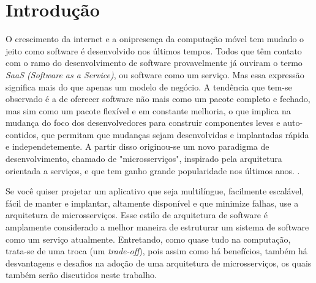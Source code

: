 \chapter{Introdução}\label{chapter-introducao}

O crescimento da internet e a onipresença da computação móvel tem mudado o jeito como software é desenvolvido nos últimos tempos. Todos que têm contato com o ramo do desenvolvimento de software provavelmente já ouviram o termo \emph{SaaS (Software as a Service)}, ou software como um serviço. Mas essa expressão significa mais do que apenas um modelo de negócio. A tendência que tem-se observado é a de oferecer software não mais como um pacote completo e fechado, mas sim como um pacote flexível e em constante melhoria, o que implica na mudança do foco dos desenvolvedores para construir componentes leves e auto-contidos, que permitam que mudanças sejam desenvolvidas e implantadas rápida e independetemente. A partir disso originou-se um novo paradigma de desenvolvimento, chamado de "microsserviços", inspirado pela arquitetura orientada a serviços, e que tem ganho grande popularidade nos últimos anos. \cite{middleware-microservices,design-monitoring-testing-waseem}.

Se você quiser projetar um aplicativo que seja multilíngue, facilmente escalável, fácil de manter e implantar, altamente disponível e que minimize falhas, use a arquitetura de microsserviços. Esse estilo de arquitetura de software é amplamente considerado a melhor maneira de estruturar um sistema de software como um serviço atualmente. Entretando, como quase tudo na computação, trata-se de uma troca (um \emph{trade-off}), pois assim como há benefícios, também há desvantagens e desafios na adoção de uma arquitetura de microsserviços, os quais também serão discutidos neste trabalho. \cite{CAOPLE, oracle_microservices}




